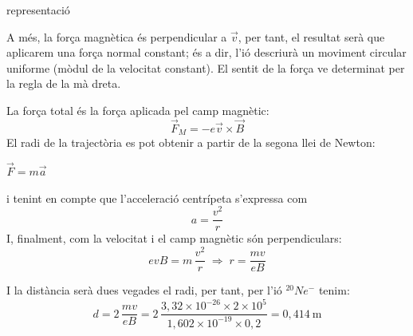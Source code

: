 \begin{solapartat}
 representació


 A més, la força magnètica és perpendicular a $\vec{v}$, per tant, el resultat serà que aplicarem una força normal constant; és a dir, l'ió descriurà un moviment circular uniforme (mòdul de la velocitat constant). El sentit de la força ve determinat per la regla de la mà dreta.

 La força total és la força aplicada pel camp magnètic:
\[ \vec{F}_M = -e\vec{v}\times\vec{B} \]
El radi de la trajectòria es pot obtenir a partir de la segona llei de Newton:

$\vec{F} = m\vec{a}$

i tenint en compte que l'acceleració centrípeta s'expressa com
\[ a = \frac{v^2}{r} \]
I, finalment, com la velocitat i el camp magnètic són perpendiculars:
\[ evB = m\,\frac{v^2}{r} \;\Rightarrow\; r = \frac{mv}{eB} \]

 I la distància serà dues vegades el radi, per tant, per l'ió $^{20}Ne^{-}$ tenim:
\[ d = 2\,\frac{mv}{eB} = 2\,\frac{3,32\times 10^{-26}\times 2\times 10^{5}}{1,602\times 10^{-19}\times 0,2} = 0,414\ \mathrm{m} \]
\end{solapartat}
